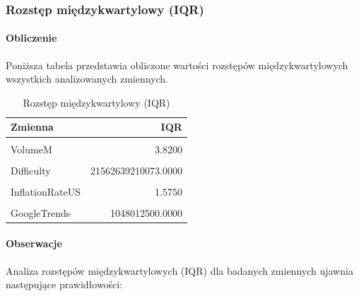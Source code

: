 \documentclass[
  11pt,
]{article}
\begin{document}
\pagebreak

\subsubsection{Rozstęp międzykwartylowy
(IQR)}\label{rozstux119p-miux119dzykwartylowy-iqr}

\paragraph{\texorpdfstring{Obliczenie
\newline}{Obliczenie }}\label{obliczenie-3}

Poniższa tabela przedstawia obliczone wartości rozstępów
międzykwartylowych wszystkich analizowanych zmiennych.

\begin{table}[!h]
\centering
\caption{\label{tab:unnamed-chunk-7}Rozstęp międzykwartylowy (IQR)}
\centering
\begin{tabular}[t]{lr}
\toprule
Zmienna & IQR\\
\midrule
\cellcolor{gray!10}{Price} & \cellcolor{gray!10}{25032.2250}\\
VolumeM & 3.8200\\
\cellcolor{gray!10}{USAvgKWHPrice} & \cellcolor{gray!10}{0.0090}\\
Difficulty & 21562639210073.0000\\
\cellcolor{gray!10}{BTCCirculation} & \cellcolor{gray!10}{6183664.7500}\\
\addlinespace
InflationRateUS & 1.5750\\
\cellcolor{gray!10}{HasMuskMentioned} & \cellcolor{gray!10}{0.0000}\\
GoogleTrends & 1048012500.0000\\
\bottomrule
\end{tabular}
\end{table}

\paragraph{Obserwacje}\label{obserwacje-6}

Analiza rozstępów międzykwartylowych (IQR) dla badanych zmiennych
ujawnia następujące prawidłowości:
\end{document}
